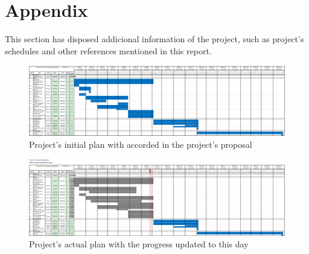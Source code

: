%
%

\chapter{Appendix}

This section has disposed addicional information of the project, such as project's 
schedules and other references mentioned in this report.

\begin{landscape}
    \begin{figure}
        \centering 
        \includegraphics[scale=0.3]{_figures/Project_initial_plan.eps}
        \caption{Project's initial plan with accorded in the project's proposal}
    \end{figure}  
\end{landscape}

\begin{landscape}
    \begin{figure}
        \centering 
        \includegraphics[scale=0.3]{_figures/Project_actual_plan.eps}
        \caption{Project's actual plan with the progress updated to this day}
    \end{figure}  
\end{landscape}